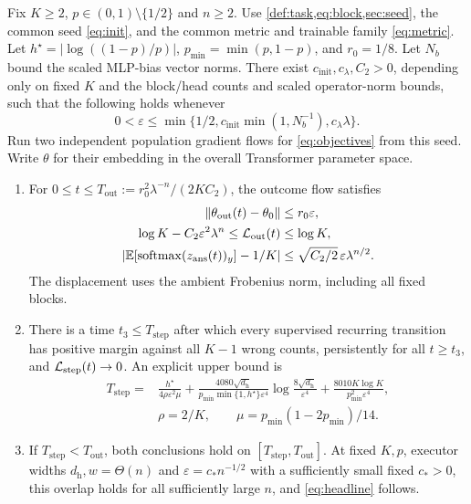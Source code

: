 \begin{theorem}\label{thm:matched}\label{thm:outcome-end}
Fix $K\ge2$, $p\in(0,1)\setminus\{1/2\}$ and $n\ge2$. Use \cref{def:task,eq:block,sec:seed}, the common seed \cref{eq:init}, and the common metric and trainable family \cref{eq:metric}. Let $h^\star=|\log((1-p)/p)|$, $p_{\min}=\min(p,1-p)$, and $r_0=1/8$. Let $N_b$ bound the scaled MLP-bias vector norms. There exist $c_{\mathrm{init}},c_\lambda,C_2>0$, depending only on fixed $K$ and the block/head counts and scaled operator-norm bounds, such that the following holds whenever
\begin{equation}\label{eq:small}
0<\varepsilon\le\min\{1/2,c_{\mathrm{init}}\min(1,N_b^{-1}),c_\lambda\lambda\}.
\end{equation}
Run two independent population gradient flows for \cref{eq:objectives} from this seed. Write $\theta$ for their embedding in the overall Transformer parameter space.
\begin{enumerate}[label=(\roman*),leftmargin=*,itemsep=2pt]
\item For $0\le t\le T_{\mathrm{out}}:=r_0^2\lambda^{-n}/(2KC_2)$, the outcome flow satisfies
\begin{align}
\|\theta_{\mathrm{out}}(t)-\theta_0\|&\le r_0\varepsilon,\nonumber\\
\log K-C_2\varepsilon^2\lambda^n\le\mathcal L_{\mathrm{out}}(t)&\le\log K,\label{eq:plateau}\\
\left|\mathbb E[\operatorname{softmax}(z_{\mathrm{ans}}(t))_y]-1/K\right|&\le\sqrt{C_2/2}\,\varepsilon\lambda^{n/2}.\nonumber
\end{align}
The displacement uses the ambient Frobenius norm, including all fixed blocks.
\item There is a time $t_3\le T_{\mathrm{step}}$ after which every supervised recurring transition has positive margin against all $K-1$ wrong counts, persistently for all $t\ge t_3$, and $\mathcal L_{\mathrm{step}}(t)\to0$. An explicit upper bound is
\begin{equation}\label{eq:focused-time}
\begin{split}
T_{\mathrm{step}}={}&\frac{h^\star}{4\rho\varepsilon^2\mu}
+\frac{4080\sqrt{d_{\mathrm h}}}{p_{\min}\min\{1,h^\star\}\varepsilon^4}
\log\frac{8\sqrt{d_{\mathrm h}}}{\varepsilon^4}
+\frac{8010K\log K}{p_{\min}^2\varepsilon^4},\\
&\rho=2/K,\qquad \mu=p_{\min}(1-2p_{\min})/14.
\end{split}
\end{equation}
\item If $T_{\mathrm{step}}<T_{\mathrm{out}}$, both conclusions hold on $[T_{\mathrm{step}},T_{\mathrm{out}}]$. At fixed $K,p$, executor widths $d_{\mathrm h},w=\Theta(n)$ and $\varepsilon=c_*n^{-1/2}$ with a sufficiently small fixed $c_*>0$, this overlap holds for all sufficiently large $n$, and \cref{eq:headline} follows.
\end{enumerate}
\end{theorem}
